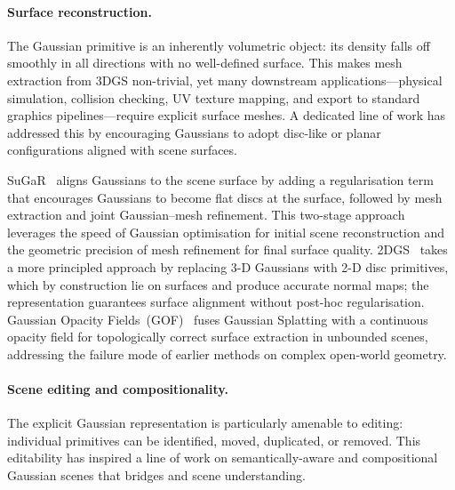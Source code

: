 \paragraph{Surface reconstruction.}
The Gaussian primitive is an inherently volumetric object: its density falls
off smoothly in all directions with no well-defined surface.
This makes mesh extraction from 3DGS non-trivial, yet many downstream
applications---physical simulation, collision checking, UV texture mapping,
and export to standard graphics pipelines---require explicit surface meshes.
A dedicated line of work has addressed this by encouraging Gaussians to
adopt disc-like or planar configurations aligned with scene surfaces.

SuGaR~\citep{guedon2024sugar} aligns Gaussians to the scene surface by adding
a regularisation term that encourages Gaussians to become flat discs at
the surface, followed by mesh extraction and joint Gaussian--mesh refinement.
This two-stage approach leverages the speed of Gaussian optimisation for
initial scene reconstruction and the geometric precision of mesh refinement
for final surface quality.
2DGS~\citep{huang2024_2dgs} takes a more principled approach by replacing
3-D Gaussians with 2-D disc primitives, which by construction lie on surfaces
and produce accurate normal maps; the representation guarantees surface
alignment without post-hoc regularisation.
Gaussian Opacity Fields~(GOF)~\citep{yu2024gof} fuses Gaussian Splatting with
a continuous opacity field for topologically correct surface extraction in
unbounded scenes, addressing the failure mode of earlier methods on complex
open-world geometry.

\paragraph{Scene editing and compositionality.}
The explicit Gaussian representation is particularly amenable to editing:
individual primitives can be identified, moved, duplicated, or removed.
This editability has inspired a line of work on semantically-aware and
compositional Gaussian scenes that bridges \nvs{} and scene understanding.

